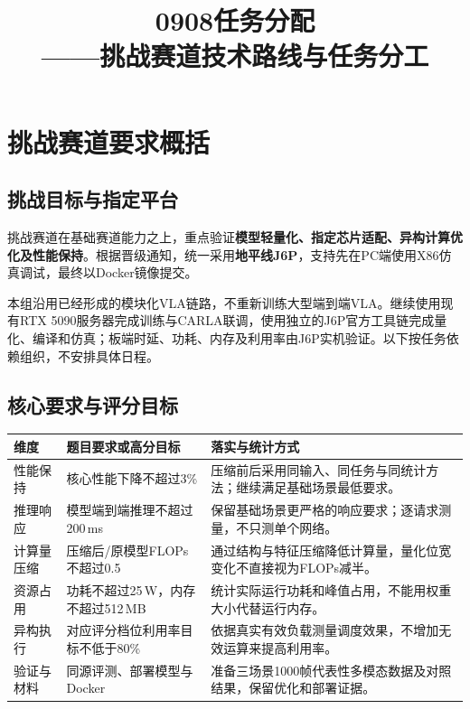 \documentclass[a4paper,11pt]{article}
\begin{document}
\title{0908任务分配\\[0.4em]\large ——挑战赛道技术路线与任务分工}
\author{}
\date{}
\maketitle
\vspace{-1.8em}
\section{挑战赛道要求概括}
\subsection{挑战目标与指定平台}
挑战赛道在基础赛道能力之上，重点验证\textbf{模型轻量化、指定芯片适配、异构计算优化及性能保持}。根据晋级通知，统一采用\textbf{地平线J6P}，支持先在PC端使用X86仿真调试，最终以Docker镜像提交。

本组沿用已经形成的模块化VLA链路，不重新训练大型端到端VLA。继续使用现有RTX 5090服务器完成训练与CARLA联调，使用独立的J6P官方工具链完成量化、编译和仿真；板端时延、功耗、内存及利用率由J6P实机验证。以下按任务依赖组织，不安排具体日程。

\subsection{核心要求与评分目标}
\noindent\begin{tabularx}{\textwidth}{p{2.3cm}p{4.0cm}L}
\toprule
维度 & 题目要求或高分目标 & 落实与统计方式\\
\midrule
性能保持 & 核心性能下降不超过3\% & 压缩前后采用同输入、同任务与同统计方法；继续满足基础场景最低要求。\\
推理响应 & 模型端到端推理不超过200\,ms & 保留基础场景更严格的响应要求；逐请求测量，不只测单个网络。\\
计算量压缩 & 压缩后/原模型FLOPs不超过0.5 & 通过结构与特征压缩降低计算量，量化位宽变化不直接视为FLOPs减半。\\
资源占用 & 功耗不超过25\,W，内存不超过512\,MB & 统计实际运行功耗和峰值占用，不能用权重大小代替运行内存。\\
异构执行 & 对应评分档位利用率目标不低于80\% & 依据真实有效负载测量调度效果，不增加无效运算来提高利用率。\\
验证与材料 & 同源评测、部署模型与Docker & 准备三场景1000帧代表性多模态数据及对照结果，保留优化和部署证据。\\
\bottomrule
\end{tabularx}
\end{document}
